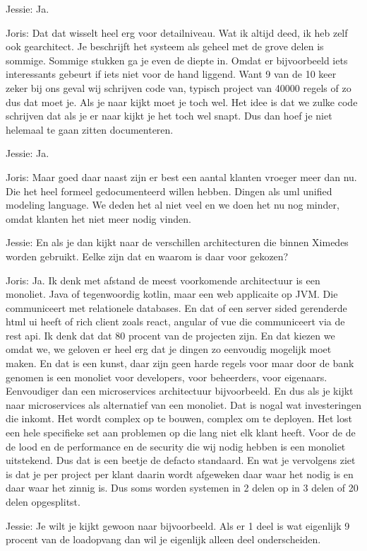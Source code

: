 Jessie: Ja.

Joris: Dat dat wisselt heel erg voor detailniveau. Wat ik altijd deed, ik heb zelf ook gearchitect. Je beschrijft het systeem als geheel met de grove delen is sommige. Sommige stukken ga je even de diepte in. Omdat er bijvoorbeeld iets interessants gebeurt if iets niet voor de hand liggend. Want 9 van de 10 keer zeker bij ons geval wij schrijven code van, typisch project van 40000 regels of zo dus dat moet je. Als je naar kijkt moet je toch wel. Het idee is dat we zulke code schrijven dat als je er naar kijkt je het toch wel snapt. Dus dan hoef je niet helemaal te gaan zitten documenteren.

Jessie: Ja.

Joris: Maar goed daar naast zijn er best een aantal klanten vroeger meer dan nu. Die het heel formeel gedocumenteerd willen hebben. Dingen als uml unified modeling language. We deden het al niet veel en we doen het nu nog minder, omdat klanten het niet meer nodig vinden.

Jessie: En als je dan kijkt naar de verschillen architecturen die binnen Ximedes worden gebruikt. Eelke zijn dat en waarom is daar voor gekozen?

Joris: Ja. Ik denk met afstand de meest voorkomende architectuur is een monoliet. Java of tegenwoordig kotlin, maar een web applicaite op JVM. Die communiceert met relationele databases. En dat of een server sided gerenderde html ui heeft of rich client zoals react, angular of vue die communiceert via de rest api. Ik denk dat dat 80 procent van de projecten zijn. En dat kiezen we omdat we, we geloven er heel erg dat je dingen zo eenvoudig mogelijk moet maken. En dat is een kunst, daar zijn geen harde regels voor maar door de bank genomen is een monoliet voor developers, voor beheerders, voor eigenaars. Eenvoudiger dan een microservices architectuur bijvoorbeeld. En dus als je kijkt naar microservices als alternatief van een monoliet. Dat is nogal wat investeringen die inkomt. Het wordt complex op te bouwen, complex om te deployen. Het lost een hele specifieke set aan problemen op die lang niet elk klant heeft. Voor de de de lood en de performance en de security die wij nodig hebben is een monoliet uitstekend. Dus dat is een beetje de defacto standaard. En wat je vervolgens ziet is dat je per project per klant daarin wordt afgeweken daar waar het nodig is en daar waar het zinnig is. Dus soms worden systemen in 2 delen op in 3 delen of 20 delen opgesplitst.

Jessie: Je wilt je kijkt gewoon naar bijvoorbeeld. Als er 1 deel is wat eigenlijk 9 procent van de loadopvang dan wil je eigenlijk alleen deel onderscheiden.

